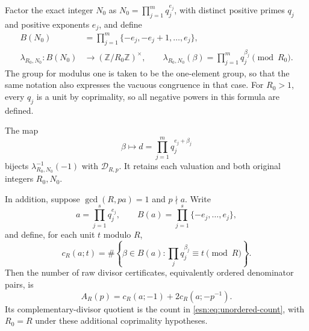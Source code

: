 Factor the exact integer \(N_0\) as
\(N_0=\prod_{j=1}^{m}q_j^{e_j}\), with distinct positive primes
\(q_j\) and positive exponents \(e_j\), and define
\begin{equation}
 \begin{split}
 B(N_0)&=\prod_{j=1}^{m}\{-e_j,-e_j+1,\ldots,e_j\},\\
 \lambda_{R_0,N_0}:B(N_0)&\longrightarrow(\mathbb Z/R_0\mathbb Z)^\times,
 \qquad
 \lambda_{R_0,N_0}(\beta)=\prod_{j=1}^{m}q_j^{\beta_j}\pmod {R_0}.
 \end{split}
 \label{esn:eq:exponent-box}
\end{equation}
The group for modulus one is taken to be the one-element group, so that
the same notation also expresses the vacuous congruence in that case.
For \(R_0>1\), every \(q_j\) is a unit by coprimality, so all
negative powers in this formula are defined.

\begin{theorem}
\label{esn:thm:raw-channels}
The map
\begin{equation}
 \beta\longmapsto d=\prod_{j=1}^{m}q_j^{e_j+\beta_j}
 \label{esn:eq:exponent-to-divisor}
\end{equation}
bijects \(\lambda_{R_0,N_0}^{-1}(-1)\) with
\(\mathcal D_{R,p}\).  It retains each valuation and both original
integers \(R_0,N_0\).

In addition, suppose \(\gcd(R,pa)=1\) and \(p\nmid a\).
Write
\[
 a=\prod_{j=1}^{s}q_j^{e_j},\qquad
 B(a)=\prod_{j=1}^{s}\{-e_j,\ldots,e_j\},
\]
and define, for each unit
\(t\) modulo \(R\),
\[
 c_R(a;t)=\#\left\{\beta\in B(a):
                                 \prod_j q_j^{\beta_j}\equiv t\pmod R\right\}.
\]
Then the number of raw divisor certificates, equivalently ordered
denominator pairs, is
\begin{equation}
 A_R(p)=c_R(a;-1)+2c_R(a;-p^{-1}).
 \label{esn:eq:two-raw-channels}
\end{equation}
Its complementary-divisor quotient is the count in
\eqref{esn:eq:unordered-count}, with \(R_0=R\) under these additional
coprimality hypotheses.
\end{theorem}

